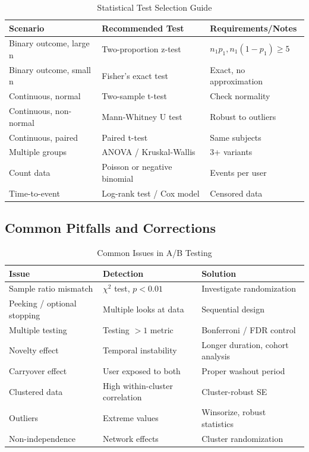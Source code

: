 \begin{table}[h]
\centering
\caption{Statistical Test Selection Guide}
\begin{tabular}{p{4cm}p{4cm}p{5cm}}
\toprule
\textbf{Scenario} & \textbf{Recommended Test} & \textbf{Requirements/Notes} \\
\midrule
Binary outcome, large n & Two-proportion z-test & $n_1p_1, n_1(1-p_1) \geq 5$ \\
Binary outcome, small n & Fisher's exact test & Exact, no approximation \\
Continuous, normal & Two-sample t-test & Check normality \\
Continuous, non-normal & Mann-Whitney U test & Robust to outliers \\
Continuous, paired & Paired t-test & Same subjects \\
Multiple groups & ANOVA / Kruskal-Wallis & 3+ variants \\
Count data & Poisson or negative binomial & Events per user \\
Time-to-event & Log-rank test / Cox model & Censored data \\
\bottomrule
\end{tabular}
\end{table}

\subsection{Common Pitfalls and Corrections}

\begin{table}[h]
\centering
\caption{Common Issues in A/B Testing}
\begin{tabular}{p{5cm}p{4cm}p{4cm}}
\toprule
\textbf{Issue} & \textbf{Detection} & \textbf{Solution} \\
\midrule
Sample ratio mismatch & $\chi^2$ test, $p < 0.01$ & Investigate randomization \\
Peeking / optional stopping & Multiple looks at data & Sequential design \\
Multiple testing & Testing $>1$ metric & Bonferroni / FDR control \\
Novelty effect & Temporal instability & Longer duration, cohort analysis \\
Carryover effect & User exposed to both & Proper washout period \\
Clustered data & High within-cluster correlation & Cluster-robust SE \\
Outliers & Extreme values & Winsorize, robust statistics \\
Non-independence & Network effects & Cluster randomization \\
\bottomrule
\end{tabular}
\end{table}

